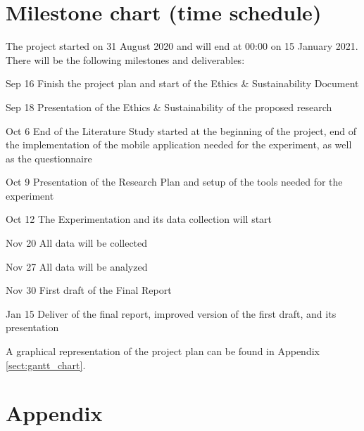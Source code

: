 \documentclass[12pt,twoside,english]{article}
\begin{document}
\section{Milestone chart (time schedule)}
\label{sect:milestones}

The project started on 31 August 2020 and will end at 00:00 on 15 January 2021. There will be the following milestones and deliverables:

\begin{description}
\item{Sep 16} Finish the project plan and start of the Ethics \& Sustainability Document

\item {Sep 18} Presentation of the Ethics \& Sustainability of the proposed research

\item {Oct 6} End of the Literature Study started at the beginning of the project, end of the implementation of the mobile application needed for the experiment, as well as the questionnaire

\item {Oct 9} Presentation of the Research Plan and setup of the tools needed for the experiment

\item {Oct 12} The Experimentation and its data collection will start

\item {Nov 20} All data will be collected

\item {Nov 27} All data will be analyzed

\item {Nov 30} First draft of the Final Report

\item {Jan 15} Deliver of the final report, improved version of the first draft, and its presentation

\end{description}

A graphical representation of the project plan can be found in Appendix \ref{sect:gantt_chart}.


% 


\appendix
\section{Appendix}
\label{sect:appendix}
\end{document}
